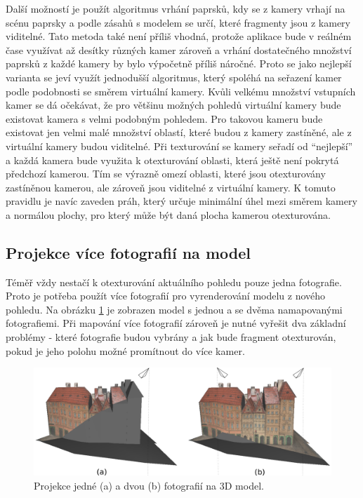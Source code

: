 \documentclass[11pt,twoside,a4paper]{book}
\begin{document}
Další možností je použít algoritmus vrhání paprsků, kdy se z kamery vrhají na scénu paprsky a podle zásahů s modelem se určí, které fragmenty jsou z kamery viditelné. Tato metoda také není příliš vhodná, protože aplikace bude v reálném čase využívat až desítky různých kamer zároveň a vrhání dostatečného množství paprsků z každé kamery by bylo výpočetně příliš náročné. Proto se jako nejlepší varianta se jeví využít jednodušší algoritmus, který spoléhá na seřazení kamer podle podobnosti se směrem virtuální kamery. Kvůli velkému množství vstupních kamer se dá očekávat, že pro většinu možných pohledů virtuální kamery bude existovat kamera s velmi podobným pohledem. Pro takovou kameru bude existovat jen velmi malé množství oblastí, které budou z kamery zastíněné, ale z virtuální kamery budou viditelné. Při texturování se kamery seřadí od ``nejlepší'' a každá kamera bude využita k otexturování oblasti, která ještě není pokrytá předchozí kamerou. Tím se výrazně omezí oblasti, které jsou otexturovány zastíněnou kamerou, ale zároveň jsou viditelné z virtuální kamery. K tomuto pravidlu je navíc zaveden práh, který určuje minimální úhel mezi směrem kamery a normálou plochy, pro který může být daná plocha kamerou otexturována. 


\subsection{Projekce více fotografií na model}
Téměř vždy nestačí k otexturování aktuálního pohledu pouze jedna fotografie. Proto je potřeba použít více fotografií pro vyrenderování modelu z nového pohledu. Na obrázku \ref{fig:dum-1} je zobrazen model s jednou a se dvěma namapovanými fotografiemi.  Při mapování více fotografií zároveň je nutné vyřešit dva základní problémy - které fotografie budou vybrány a jak bude fragment otexturován, pokud je jeho polohu možné promítnout do více kamer.

\begin{figure}[bh]
\begin{center}
\includegraphics[width=\textwidth]{figures/dum-1}
\caption{Projekce jedné (a) a dvou (b) fotografií na 3D model.}
\label{fig:dum-1}
\end{center}
\end{figure}
\end{document}
